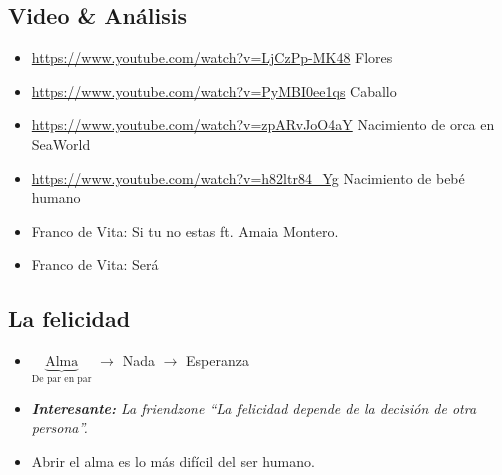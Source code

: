 \subsection{Video \& Análisis}
\begin{itemize}
    \item \url{https://www.youtube.com/watch?v=LjCzPp-MK48} Flores
    \item \url{https://www.youtube.com/watch?v=PyMBI0ee1qs} Caballo
    \item \url{https://www.youtube.com/watch?v=zpARvJoO4aY} Nacimiento de orca en SeaWorld
    \item \url{https://www.youtube.com/watch?v=h82ltr84_Yg} Nacimiento de bebé humano
    \item Franco de Vita: Si tu no estas ft. Amaia Montero.
    \item Franco de Vita: Será
\end{itemize}


\subsection{La felicidad}
\begin{itemize}
    \item $\underbrace{\text{Alma}}_{\text{De par en par}}$ $\rightarrow$ Nada $\rightarrow$ Esperanza 
    \item \emph{\textbf{Interesante:} La friendzone ``La felicidad depende de la decisión de otra persona''.}
    \item Abrir el alma es lo más difícil del ser humano. 
\end{itemize}

